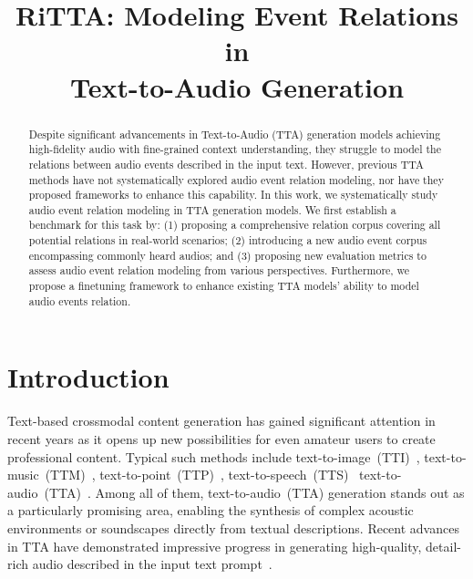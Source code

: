 \title{RiTTA: Modeling Event Relations in \\Text-to-Audio Generation}



\maketitle
\vspace{-3mm}
\begin{abstract}
Despite significant advancements in Text-to-Audio (TTA) generation models achieving high-fidelity audio with fine-grained context understanding, they struggle to model the relations between audio events described in the input text. However, previous TTA methods have not systematically explored audio event relation modeling, nor have they proposed frameworks to enhance this capability. In this work, we systematically study audio event relation modeling in TTA generation models. We first establish a benchmark for this task by: (1) proposing a comprehensive relation corpus covering all potential relations in real-world scenarios; (2) introducing a new audio event corpus encompassing commonly heard audios; and (3) proposing new evaluation metrics to assess audio event relation modeling from various perspectives. Furthermore, we propose a finetuning framework to enhance existing TTA models' ability to model audio events relation.
\end{abstract}
\vspace{-2mm}
\section{Introduction}
\vspace{-2mm}
\label{sec:intro}

Text-based crossmodal content generation has gained significant attention in recent years as it opens up new possibilities for even amateur users to create professional content. Typical such methods include text-to-image~(TTI)~\citep{ho2020denoising}, text-to-music~(TTM)~\citep{musicGEN}, text-to-point~(TTP)~\citep{point_E}, text-to-speech~(TTS)~\citep{fast_speech} text-to-audio~(TTA)~\citep{audioldm2,makeanaudio}. Among all of them, text-to-audio~(TTA) generation stands out as a particularly promising area, enabling the synthesis of complex acoustic environments or soundscapes directly from textual descriptions. Recent advances in TTA have demonstrated impressive progress in generating high-quality, detail-rich audio described in the input text prompt~\citep{audioldm2,liu2023audioldm,makeanaudio,makeanaudio_v2,ghosal2023tango,ghosal2023tango2,kreuk2022audiogen}.

